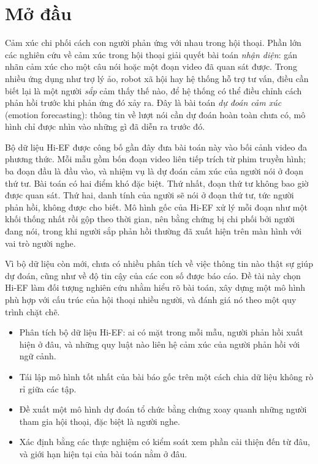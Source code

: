 \clearpage
{}
{}
\chapter*{Mở đầu}


Cảm xúc chi phối cách con người phản ứng với nhau trong hội thoại. Phần lớn các nghiên cứu về cảm xúc trong hội thoại giải quyết bài toán \emph{nhận diện}: gán nhãn cảm xúc cho một câu nói hoặc một đoạn video đã quan sát được. Trong nhiều ứng dụng như trợ lý ảo, robot xã hội hay hệ thống hỗ trợ tư vấn, điều cần biết lại là một người \emph{sắp} cảm thấy thế nào, để hệ thống có thể điều chỉnh cách phản hồi trước khi phản ứng đó xảy ra. Đây là bài toán \emph{dự đoán cảm xúc} (emotion forecasting): thông tin về lượt nói cần dự đoán hoàn toàn chưa có, mô hình chỉ được nhìn vào những gì đã diễn ra trước đó.

Bộ dữ liệu Hi-EF \cite{wang2026hief} được công bố gần đây đưa bài toán này vào bối cảnh video đa phương thức. Mỗi mẫu gồm bốn đoạn video liên tiếp trích từ phim truyền hình; ba đoạn đầu là đầu vào, và nhiệm vụ là dự đoán cảm xúc của người nói ở đoạn thứ tư. Bài toán có hai điểm khó đặc biệt. Thứ nhất, đoạn thứ tư không bao giờ được quan sát. Thứ hai, danh tính của người sẽ nói ở đoạn thứ tư, tức người phản hồi, không được cho biết. Mô hình gốc của Hi-EF xử lý mỗi đoạn như một khối thống nhất rồi gộp theo thời gian, nên bằng chứng bị chi phối bởi người đang nói, trong khi người sắp phản hồi thường đã xuất hiện trên màn hình với vai trò người nghe.

Vì bộ dữ liệu còn mới, chưa có nhiều phân tích về việc thông tin nào thật sự giúp dự đoán, cũng như về độ tin cậy của các con số được báo cáo. Đề tài này chọn Hi-EF làm đối tượng nghiên cứu nhằm hiểu rõ bài toán, xây dựng một mô hình phù hợp với cấu trúc của hội thoại nhiều người, và đánh giá nó theo một quy trình chặt chẽ.

\vspace{0.3cm}

\renewcommand{\labelitemi}{$-$}
\begin{itemize}
	\item Phân tích bộ dữ liệu Hi-EF: ai có mặt trong mỗi mẫu, người phản hồi xuất hiện ở đâu, và những quy luật nào liên hệ cảm xúc của người phản hồi với ngữ cảnh.
	\item Tái lập mô hình tốt nhất của bài báo gốc trên một cách chia dữ liệu không rò rỉ giữa các tập.
	\item Đề xuất một mô hình dự đoán tổ chức bằng chứng xoay quanh những người tham gia hội thoại, đặc biệt là người nghe.
	\item Xác định bằng các thực nghiệm có kiểm soát xem phần cải thiện đến từ đâu, và giới hạn hiện tại của bài toán nằm ở đâu.
\end{itemize}

